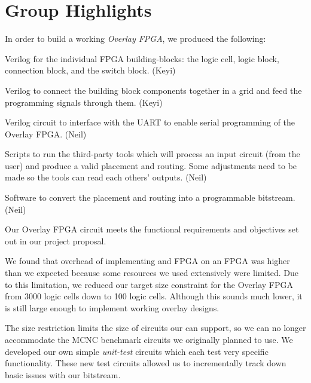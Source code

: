 \section*{Group Highlights}

In order to build a working \emph{Overlay FPGA}, we produced the following:
\begin{itemlist}
\item Verilog for the individual FPGA building-blocks: the logic cell, logic block, connection block, and the switch block. (Keyi)
\item Verilog to connect the building block components together in a grid and feed the programming signals through them. (Keyi)
\item Verilog circuit to interface with the UART to enable serial programming of the Overlay FPGA. (Neil)
\item Scripts to run the third-party tools which will process an input circuit (from the user) and produce a valid placement and routing. Some adjustments need to be made so the tools can read each others' outputs. (Neil)
\item Software to convert the placement and routing into a programmable bitstream. (Neil)
\end{itemlist}

Our Overlay FPGA circuit meets the functional requirements and objectives set out in our project proposal.

We found that overhead of implementing and FPGA on an FPGA was higher than we expected because some resources we used extensively were limited.
Due to this limitation, we reduced our target size constraint for the Overlay FPGA from 3000 logic cells down to 100 logic cells. %
Although this sounds much lower, it is still large enough to implement working overlay designs.

The size restriction limits the size of circuits our \overlay can support, so we can no longer accommodate the MCNC benchmark circuits we originally planned to use.
We developed our own simple \emph{unit-test} circuits which each test very specific functionality.
These new test circuits allowed us to incrementally track down basic issues with our bitstream.

